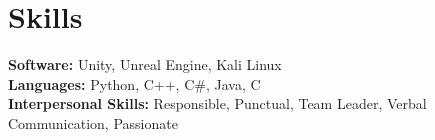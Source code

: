 \documentclass[a4paper,10pt]{article}
\begin{document}
\section*{Skills}
\textbf{Software:} Unity, Unreal Engine, Kali Linux \\
\textbf{Languages:} Python, C++, C\#, Java, C \\
\textbf{Interpersonal Skills:} Responsible, Punctual, Team Leader, Verbal Communication, Passionate \\
\end{document}
